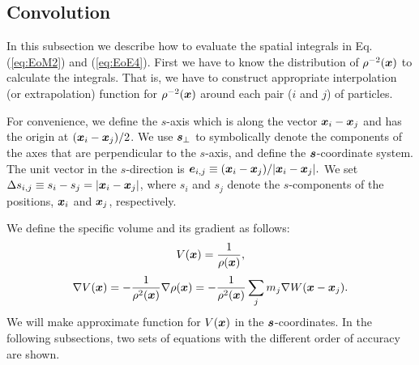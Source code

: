 \documentclass{cjour}
\newcommand{ \Vec   }[1]{ \mbox{\boldmath $ #1 $} }
\begin{document}
\begin{article}
\subsection{Convolution}
                                                   \label{Sec:Conv}
In this subsection we describe how to evaluate the spatial integrals 
in Eq.(\ref{eq:EoM2}) and (\ref{eq:EoE4}). 
First we have to know the distribution of 
$\rho^{-2}(\Vec{x})$ to calculate 
the integrals.  
That is, we have to construct appropriate interpolation 
(or extrapolation) function for $\rho^{-2}(\Vec{x})$ around 
each pair ($i$ and $j$) of particles. 
 
For convenience, we define the $s$-axis which is along 
the vector $\Vec{x}_i-\Vec{x}_j$ and has the origin at 
$(\Vec{x}_i-\Vec{x}_j)/2$. 
We use $\Vec{s}_{\perp}$ to symbolically denote the components of 
the axes that are perpendicular to the $s$-axis, 
and define the $\Vec{s}$-coordinate system. 
The unit vector in the $s$-direction is 
%
 $
    \Vec{e}_{i,j} \equiv (\Vec{x}_i-\Vec{x}_j)/|\Vec{x}_i-\Vec{x}_j| .
 $
%
We set $\Delta s_{i,j} \equiv s_i-s_j=|\Vec{x}_i-\Vec{x}_j|$,  
where $s_i$ and $s_j$ denote 
the $s$-components of the positions, $\Vec{x}_i$ and $\Vec{x}_j$, 
respectively.  

We define the specific volume and its gradient as follows:
\begin{equation}
                 V(\Vec{x}) = \frac{1}{\rho(\Vec{x})} , 
\end{equation}
\begin{equation}
                 \nabla V(\Vec{x}) = -\frac{1}{\rho^2(\Vec{x})} 
                                      \nabla \rho(\Vec{x}) 
                 = - \frac{1}{\rho^2(\Vec{x})}
                     \sum_j m_j \nabla W(\Vec{x}-\Vec{x}_j).
\end{equation}
We will make approximate function for $V(\Vec{x})$ in the 
$\Vec{s}$-coordinates. 
In the following subsections,   
two sets of equations with the different order of 
accuracy are shown. 
%

\end{article}
\end{document}
